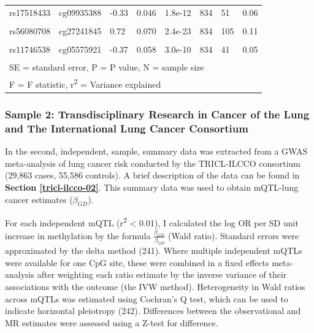 \documentclass[11pt,twoside]{bristolthesis}
\begin{document}
\begin{table}[!h]
{\begin{tabular}[t]{llllllll}
rs17518433 & cg09935388 & -0.33 & 0.046 & 1.8e-12 & 834 & 51 & 0.06\\
\cellcolor{gray!6}{rs463924} & \cellcolor{gray!6}{cg26963277} & \cellcolor{gray!6}{-0.39} & \cellcolor{gray!6}{0.045} & \cellcolor{gray!6}{6.8e-18} & \cellcolor{gray!6}{834} & \cellcolor{gray!6}{78} & \cellcolor{gray!6}{0.09}\\
rs56080708 & cg27241845 & 0.72 & 0.070 & 2.4e-23 & 834 & 105 & 0.11\\
\cellcolor{gray!6}{rs11744553} & \cellcolor{gray!6}{cg05575921} & \cellcolor{gray!6}{0.22} & \cellcolor{gray!6}{0.040} & \cellcolor{gray!6}{7.2e-08} & \cellcolor{gray!6}{834} & \cellcolor{gray!6}{30} & \cellcolor{gray!6}{0.03}\\
\addlinespace
rs11746538 & cg05575921 & -0.37 & 0.058 & 3.0e-10 & 834 & 41 & 0.05\\
\bottomrule
\multicolumn{8}{l}{\textsuperscript{} SE = standard error, P = P value, N = sample size}\\
\multicolumn{8}{l}{\textsuperscript{} F = F statistic, r\textsuperscript{2} = Variance explained}\\
\end{tabular}}
\end{table}
\hypertarget{sample-2-transdisciplinary-research-in-cancer-of-the-lung-and-the-international-lung-cancer-consortium}{%
\subsubsection{Sample 2: Transdisciplinary Research in Cancer of the Lung and The International Lung Cancer Consortium}\label{sample-2-transdisciplinary-research-in-cancer-of-the-lung-and-the-international-lung-cancer-consortium}}

In the second, independent, sample, summary data was extracted from a GWAS meta-analysis of lung cancer risk conducted by the TRICL-ILCCO consortium (29,863 cases, 55,586 controls). A brief description of the data can be found in \textbf{Section \ref{tricl-ilcco-02}}. This summary data was used to obtain mQTL-lung cancer estimates (\(\beta_{GD}\)).

For each independent mQTL (r\textsuperscript{2} \textless{} 0.01), I calculated the log OR per SD unit increase in methylation by the formula \(\frac{\beta_{GD}} {\beta_{GP}}\) (Wald ratio). Standard errors were approximated by the delta method (241). Where multiple independent mQTLs were available for one CpG site, these were combined in a fixed effects meta-analysis after weighting each ratio estimate by the inverse variance of their associations with the outcome (the IVW method). Heterogeneity in Wald ratios across mQTLs was estimated using Cochran's Q test, which can be used to indicate horizontal pleiotropy (242). Differences between the observational and MR estimates were assessed using a Z-test for difference.
\end{document}
